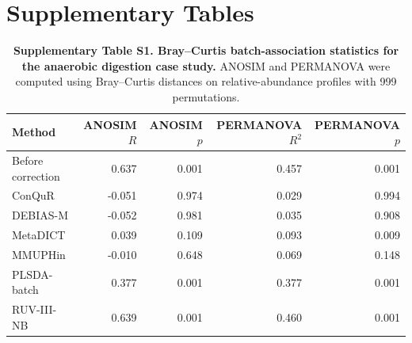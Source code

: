 \documentclass[11pt,letterpaper]{article}
\begin{document}
\newpage
\section*{Supplementary Tables}
\label{sec:supp-tables}

\begin{table}[H]
\centering
\caption{\textbf{Supplementary Table S1. Bray--Curtis batch-association statistics for the anaerobic digestion case study.} ANOSIM and PERMANOVA were computed using Bray--Curtis distances on relative-abundance profiles with 999 permutations.}
\label{tab:case-study-bray-stats}
\begin{tabular}{lrrrr}
\toprule
Method & ANOSIM $R$ & ANOSIM $p$ & PERMANOVA $R^2$ & PERMANOVA $p$ \\
\midrule
Before correction & 0.637 & 0.001 & 0.457 & 0.001 \\
ConQuR & -0.051 & 0.974 & 0.029 & 0.994 \\
DEBIAS-M & -0.052 & 0.981 & 0.035 & 0.908 \\
MetaDICT & 0.039 & 0.109 & 0.093 & 0.009 \\
MMUPHin & -0.010 & 0.648 & 0.069 & 0.148 \\
PLSDA-batch & 0.377 & 0.001 & 0.377 & 0.001 \\
RUV-III-NB & 0.639 & 0.001 & 0.460 & 0.001 \\
\bottomrule
\end{tabular}
\end{table}
\end{document}
